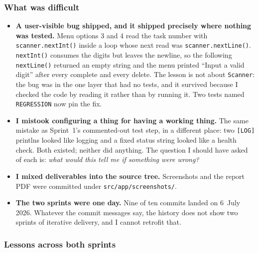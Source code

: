 \documentclass[11pt,a4paper]{article}
\newcommand{\code}[1]{\texttt{\small #1}}
\begin{document}
\subsubsection*{What was difficult}
\begin{itemize}
  \item \textbf{A user-visible bug shipped, and it shipped precisely where
        nothing was tested.} Menu options 3 and 4 read the task number with
        \code{scanner.nextInt()} inside a loop whose next read was
        \code{scanner.nextLine()}. \code{nextInt()} consumes the digits but
        leaves the newline, so the following \code{nextLine()} returned an empty
        string and the menu printed ``Input a valid digit'' after every complete
        and every delete. The lesson is not about \code{Scanner}: the bug was in
        the one layer that had no tests, and it survived because I checked the
        code by reading it rather than by running it. Two tests named
        \code{REGRESSION} now pin the fix.
  \item \textbf{I mistook configuring a thing for having a working thing.} The
        same mistake as Sprint~1's commented-out test step, in a different
        place: two \code{[LOG]} printlns looked like logging and a fixed status
        string looked like a health check. Both existed; neither did anything.
        The question I should have asked of each is: \emph{what would this tell
        me if something were wrong?}
  \item \textbf{I mixed deliverables into the source tree.} Screenshots and the
        report PDF were committed under \code{src/app/screenshots/}.
  \item \textbf{The two sprints were one day.} Nine of ten commits landed on
        6~July 2026. Whatever the commit messages say, the history does not show
        two sprints of iterative delivery, and I cannot retrofit that.
\end{itemize}

\subsubsection*{Lessons across both sprints}
\end{document}
